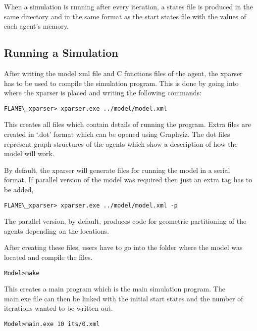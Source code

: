 \begin{itemize}
When a simulation is running after every iteration, a states file is produced
in the same directory and in the same format as the start states file with the
values of each agent's memory.

\subsection{Running a Simulation}

After writing the model xml file and C functions files of the agent, the xparser has to be used to compile the simulation program. This is done by going into where the xparser is placed and writing the following commands:

\begin{mylisting}
\begin{verbatim}
FLAME\_xparser> xparser.exe ../model/model.xml
\end{verbatim}
\end{mylisting}

This creates all files which contain details of running the program. Extra files are created in `.dot' format which can be opened using Graphviz. The dot files represent graph structures of the agents which show a description of how the model will work.

By default, the xparser will generate files for running the model in a serial format. If parallel version of the model was required then just an extra tag has to be added,

\begin{mylisting}
\begin{verbatim}
FLAME\_xparser> xparser.exe ../model/model.xml -p
\end{verbatim}
\end{mylisting}

The parallel version, by default, produces code for geometric partitioning of the agents depending on the locations. 

After creating these files, users have to go into the folder where the model was located and compile the files.

\begin{mylisting}
\begin{verbatim}
Model>make 
\end{verbatim}
\end{mylisting}

This creates a main program which is the main simulation program. The main.exe file can then be linked with the initial start states and the number of iterations wanted to be written out.
\begin{mylisting}
\begin{verbatim}
Model>main.exe 10 its/0.xml
\end{verbatim}
\end{mylisting}


\end{itemize}
